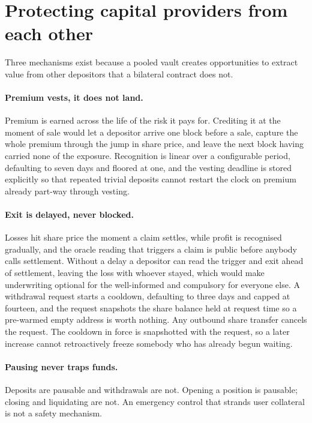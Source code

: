 \documentclass[11pt,a4paper]{article}
\begin{document}
\section{Protecting capital providers from each other}

Three mechanisms exist because a pooled vault creates opportunities to extract value from
other depositors that a bilateral contract does not.

\paragraph{Premium vests, it does not land.} Premium is earned across the life of the risk it
pays for. Crediting it at the moment of sale would let a depositor arrive one block before a
sale, capture the whole premium through the jump in share price, and leave the next block
having carried none of the exposure. Recognition is linear over a configurable period,
defaulting to seven days and floored at one, and the vesting deadline is stored explicitly so
that repeated trivial deposits cannot restart the clock on premium already part-way through
vesting.

\paragraph{Exit is delayed, never blocked.} Losses hit share price the moment a claim settles,
while profit is recognised gradually, and the oracle reading that triggers a claim is public
before anybody calls settlement. Without a delay a depositor can read the trigger and exit
ahead of settlement, leaving the loss with whoever stayed, which would make underwriting
optional for the well-informed and compulsory for everyone else. A withdrawal request starts a
cooldown, defaulting to three days and capped at fourteen, and the request snapshots the share
balance held at request time so a pre-warmed empty address is worth nothing. Any outbound
share transfer cancels the request. The cooldown in force is snapshotted with the request, so
a later increase cannot retroactively freeze somebody who has already begun waiting.

\paragraph{Pausing never traps funds.} Deposits are pausable and withdrawals are not.
Opening a position is pausable; closing and liquidating are not. An emergency control that
strands user collateral is not a safety mechanism.
\end{document}
